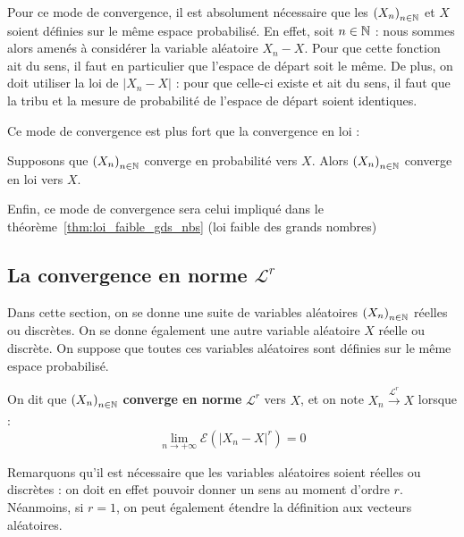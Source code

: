 \documentclass[../integ-proba.tex]{subfiles}
\begin{document}
    \begin{rem}
        Pour ce mode de convergence, il est absolument nécessaire que les $\left(X_n\right)_{n\in\mathbb{N}}$ et $X$ soient définies sur le même espace probabilisé.
        En effet, soit $n \in \mathbb{N}$ : nous sommes alors amenés à considérer la variable aléatoire $X_n - X$.
        Pour que cette fonction ait du sens, il faut en particulier que l'espace de départ soit le même.
        De plus, on doit utiliser la loi de $\left|X_n - X\right|$ : pour que celle-ci existe et ait du sens, il faut que la tribu et la mesure de probabilité de l'espace de départ soient identiques.
    \end{rem}

    Ce mode de convergence est plus fort que la convergence en loi :

    \begin{prop}
        Supposons que $\left(X_n\right)_{n\in\mathbb{N}}$ converge en probabilité vers $X$.
        Alors $\left(X_n\right)_{n\in\mathbb{N}}$ converge en loi vers $X$.
    \end{prop}

    \begin{rem}
        Enfin, ce mode de convergence sera celui impliqué dans le théorème~\ref{thm:loi_faible_gds_nbs} (loi faible des grands nombres)
    \end{rem}

    \subsection{La convergence en norme \texorpdfstring{$\mathcal{L}^r$}{Lr}}

    Dans cette section, on se donne une suite de variables aléatoires $\left(X_n\right)_{n\in\mathbb{N}}$ réelles ou discrètes.
    On se donne également une autre variable aléatoire $X$ réelle ou discrète.
    On suppose que toutes ces variables aléatoires sont définies sur le même espace probabilisé.

    \begin{defi}
        On dit que $\left(X_n\right)_{n\in\mathbb{N}}$ \textbf{converge en norme} $\mathcal{L}^r$ vers $X$, et on note $X_n \xrightarrow[]{\mathcal{L}^r} X$ lorsque :
        \begin{displaymath}
            \lim_{n \to +\infty}\mathcal{E}\left(\left|X_n - X\right|^r\right) = 0
        \end{displaymath}
    \end{defi}

    \begin{rem}
        Remarquons qu'il est nécessaire que les variables aléatoires soient réelles ou discrètes : on doit en effet pouvoir donner un sens au moment d'ordre $r$.
        Néanmoins, si $r=1$, on peut également étendre la définition aux vecteurs aléatoires.
    \end{rem}
\end{document}
